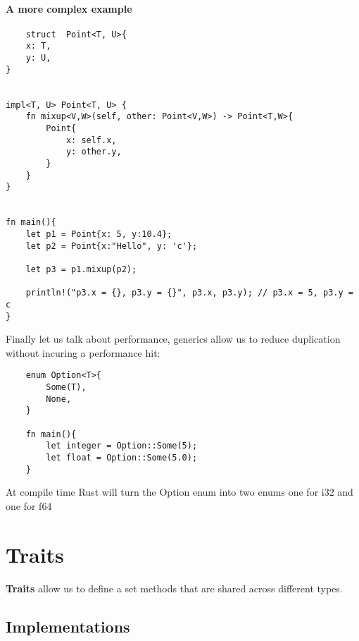 \paragraph*{A more complex example}
\begin{lstlisting}
    struct  Point<T, U>{
    x: T,
    y: U,
}


impl<T, U> Point<T, U> {
    fn mixup<V,W>(self, other: Point<V,W>) -> Point<T,W>{
        Point{
            x: self.x,
            y: other.y,
        }
    }
}


fn main(){
    let p1 = Point{x: 5, y:10.4};
    let p2 = Point{x:"Hello", y: 'c'};

    let p3 = p1.mixup(p2);

    println!("p3.x = {}, p3.y = {}", p3.x, p3.y); // p3.x = 5, p3.y = c
}
\end{lstlisting}
\newpage
Finally let us talk about performance, generics allow us to reduce duplication without incuring a performance hit:\begin{lstlisting}
    enum Option<T>{
        Some(T),
        None,
    }

    fn main(){
        let integer = Option::Some(5);
        let float = Option::Some(5.0);
    }
\end{lstlisting}
 At compile time Rust will turn the Option enum into two enums one for i32 and one for f64
 \newpage
 \section{Traits}

\begin{definition}
    \textbf{Traits} allow us to define a set methods that are shared across different types. 
\end{definition}
\subsection{Implementations}
